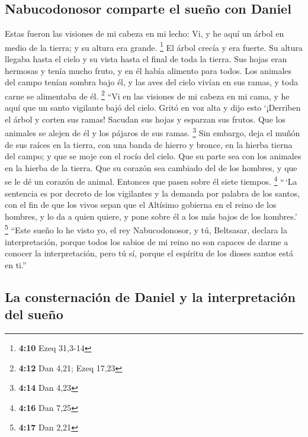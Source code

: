 \hypertarget{nabucodonosor-comparte-el-sueuxf1o-con-daniel}{%
\subsection{Nabucodonosor comparte el sueño con
Daniel}\label{nabucodonosor-comparte-el-sueuxf1o-con-daniel}}

 Estas fueron las visiones de mi cabeza en mi lecho: Vi,
y he aquí un árbol en medio de la tierra; y su altura era grande.
\footnote{\textbf{4:10} Ezeq 31,3-14}  El árbol crecía y
era fuerte. Su altura llegaba hasta el cielo y su vista hasta el final
de toda la tierra.  Sus hojas eran hermosas y tenía mucho
fruto, y en él había alimento para todos. Los animales del campo tenían
sombra bajo él, y las aves del cielo vivían en sus ramas, y toda carne
se alimentaba de él. \footnote{\textbf{4:12} Dan 4,21; Ezeq 17,23}
 ``Vi en las visiones de mi cabeza en mi cama, y he aquí
que un santo vigilante bajó del cielo.  Gritó en voz alta
y dijo esto `¡Derriben el árbol y corten sus ramas! Sacudan sus hojas y
esparzan sus frutos. Que los animales se alejen de él y los pájaros de
sus ramas. \footnote{\textbf{4:14} Dan 4,23}  Sin
embargo, deja el muñón de sus raíces en la tierra, con una banda de
hierro y bronce, en la hierba tierna del campo; y que se moje con el
rocío del cielo. Que su parte sea con los animales en la hierba de la
tierra.  Que su corazón sea cambiado del de los hombres,
y que se le dé un corazón de animal. Entonces que pasen sobre él siete
tiempos. \footnote{\textbf{4:16} Dan 7,25}  ``\,`La
sentencia es por decreto de los vigilantes y la demanda por palabra de
los santos, con el fin de que los vivos sepan que el Altísimo gobierna
en el reino de los hombres, y lo da a quien quiere, y pone sobre él a
los más bajos de los hombres.' \footnote{\textbf{4:17} Dan 2,21}
 ``Este sueño lo he visto yo, el rey Nabucodonosor, y tú,
Beltsasar, declara la interpretación, porque todos los sabios de mi
reino no son capaces de darme a conocer la interpretación, pero tú sí,
porque el espíritu de los dioses santos está en ti.''

\hypertarget{la-consternaciuxf3n-de-daniel-y-la-interpretaciuxf3n-del-sueuxf1o}{%
\subsection{La consternación de Daniel y la interpretación del
sueño}\label{la-consternaciuxf3n-de-daniel-y-la-interpretaciuxf3n-del-sueuxf1o}}

